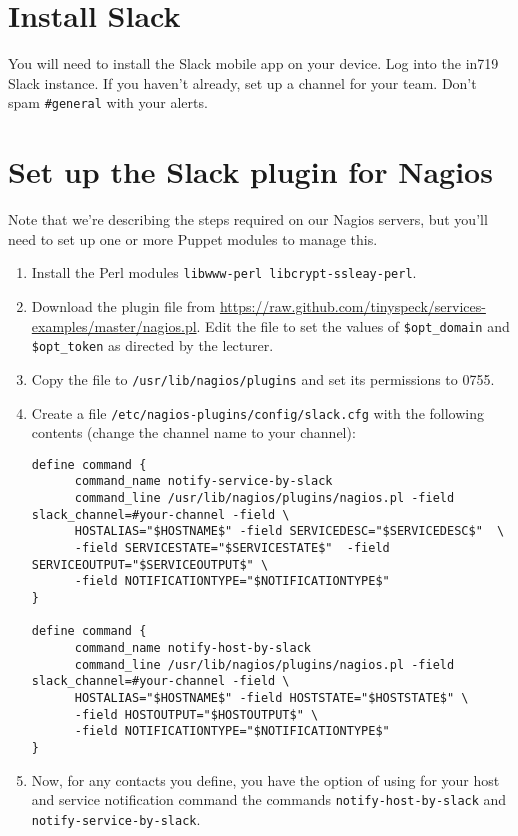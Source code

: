 \documentclass{article}   	%
\begin{document}
\section{Install Slack}
You will need to install the Slack mobile app on your device.  Log into the in719 Slack instance. If you haven't already, set up a channel for your team. Don't spam \texttt{\#general} with your alerts.

\section{Set up the Slack plugin for Nagios}

Note that we're describing the steps required on our Nagios servers, but you'll need to set up one or more Puppet modules to manage this.

\begin{enumerate}
  \item Install the Perl modules \texttt{libwww-perl libcrypt-ssleay-perl}.
  \item  Download the plugin file from \url{https://raw.github.com/tinyspeck/services-examples/master/nagios.pl}.  Edit the file to set
  the values of \texttt{\$opt\_domain} and \texttt{\$opt\_token} as directed by the lecturer. 
  \item Copy the file to \texttt{/usr/lib/nagios/plugins} and set its permissions to 0755.
  \item Create a file \texttt{/etc/nagios-plugins/config/slack.cfg} with the following contents (change the channel name to your channel):
       \begin{verbatim}
define command {
      command_name notify-service-by-slack
      command_line /usr/lib/nagios/plugins/nagios.pl -field slack_channel=#your-channel -field \
      HOSTALIAS="$HOSTNAME$" -field SERVICEDESC="$SERVICEDESC$"  \
      -field SERVICESTATE="$SERVICESTATE$"  -field SERVICEOUTPUT="$SERVICEOUTPUT$" \
      -field NOTIFICATIONTYPE="$NOTIFICATIONTYPE$"
}

define command {
      command_name notify-host-by-slack
      command_line /usr/lib/nagios/plugins/nagios.pl -field slack_channel=#your-channel -field \
      HOSTALIAS="$HOSTNAME$" -field HOSTSTATE="$HOSTSTATE$" \
      -field HOSTOUTPUT="$HOSTOUTPUT$" \
      -field NOTIFICATIONTYPE="$NOTIFICATIONTYPE$"
}
\end{verbatim}

  \item Now, for any contacts you define, you have the option of using for your host and service notification command the commands
  \texttt{notify-host-by-slack} and \texttt{notify-service-by-slack}.
  

\end{enumerate}
\end{document}
